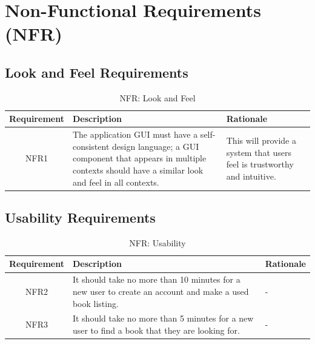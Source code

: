 \documentclass[fullpage]{article}
\begin{document}
\section{Non-Functional Requirements (NFR)}


\subsection{Look and Feel Requirements}
\begin{table}[h!]
\flushleft
\begin{tabular}{|c|p{6cm}|p{6cm}|}
\hline
 \rowcolor{lightgray} 
\textbf{Requirement} & \textbf{Description} & \textbf{Rationale} \\
\hline
NFR1 &The application GUI must have a self-consistent design language; a GUI component that appears in multiple contexts should have a similar look and feel in all contexts.& This will provide a system that users feel is trustworthy and intuitive.\\
\hline
\end{tabular}
\caption{NFR: Look and Feel}
\end{table}

\newpage

\subsection{Usability Requirements}
\begin{table}[h!]
\flushleft
\begin{tabular}{|c|p{6cm}|p{6cm}|}
\hline
 \rowcolor{lightgray} 
\textbf{Requirement} & \textbf{Description} & \textbf{Rationale} \\
\hline
NFR2 & It should take no more than 10 minutes for a new user to create an account and make a used book listing. & - \\
\hline
NFR3 & It should take no more than 5 minutes for a new user to find a book that they are looking for. & -\\
\hline
\end{tabular}
\caption{NFR: Usability}
\end{table}
\end{document}
